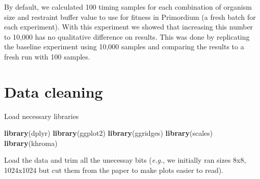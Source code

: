 \documentclass[]{book}
\newenvironment{Shaded}{\begin{snugshade}}{\end{snugshade}}
\newcommand{\KeywordTok}[1]{\textcolor[rgb]{0.13,0.29,0.53}{\textbf{#1}}}
\newcommand{\NormalTok}[1]{#1}
\begin{document}
By default, we calculated 100 timing samples for each combination of organism size and restraint buffer value to use for fitness in Primordium (a fresh batch for each experiment).
With this experiment we showed that increasing this number to 10,000 has no qualitative difference on results.
This was done by replicating the baseline experiment using 10,000 samples and comparing the results to a fresh run with 100 samples.

\hypertarget{data-cleaning-2}{%
\section{Data cleaning}\label{data-cleaning-2}}

Load necessary libraries

\begin{Shaded}
\begin{Highlighting}[]
\KeywordTok{library}\NormalTok{(dplyr)}
\KeywordTok{library}\NormalTok{(ggplot2)}
\KeywordTok{library}\NormalTok{(ggridges)}
\KeywordTok{library}\NormalTok{(scales)}
\KeywordTok{library}\NormalTok{(khroma)}
\end{Highlighting}
\end{Shaded}

Load the data and trim all the unecessay bits (\emph{e.g.}, we initially ran sizes 8x8, 1024x1024 but cut them from the paper to make plots easier to read).
\end{document}
